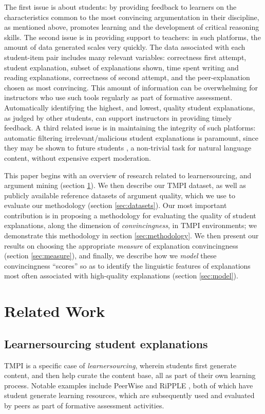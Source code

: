 \documentclass[notitlepage,12pt]{jedm}
\begin{document}
The first issue is about students: by providing feedback to learners on the 
characteristics common to the most convincing argumentation in their 
discipline, as mentioned above, promotes learning and the development of 
critical reasoning skills.
The second issue is in providing support to teachers: in such platforms, the 
amount of data generated scales very quickly.
The data associated with each student-item pair includes many relevant 
variables: correctness first attempt, student explanation, subset of 
explanations shown, time spent writing and reading explanations, correctness of 
second attempt, and the peer-explanation chosen as most convincing.   
This amount of information can be overwhelming for instructors who use such 
tools regularly as part of formative assessment. 
Automatically identifying the highest, and lowest, quality student 
explanations, as judged by other students, can support instructors in providing 
timely feedback. 
A third related issue is in maintaining the integrity of such platforms: 
automatic filtering irrelevant/malicious student explanations is paramount, 
since they may be shown to future students \cite{gagnon_filtering_2019}, a 
non-trivial task for natural language content, without expensive expert 
moderation.

This paper begins with an overview of research related to learnersourcing,  and 
argument mining (section \ref{sec:related_work}).
We then describe our TMPI dataset, as well as publicly available reference 
datasets of argument quality, which we use to evaluate our methodology (section 
\ref{sec:datasets}).
Our most important contribution is in proposing a methodology for evaluating 
the quality of student explanations, along the dimension of 
\textit{convincingness}, in TMPI environments; we demonstrate this methodology 
in section \ref{sec:methodology}.
We then present our results on choosing the appropriate \textit{measure} of 
explanation convincingness (section \ref{sec:measure}), and finally, we 
describe how we \textit{model} these convincingness ``scores'' so as to 
identify the linguistic features of explanations most often associated with 
high-quality explanations (section \ref{sec:model}).

\section{Related Work}\label{sec:related_work}

\subsection{Learnersourcing student explanations}
TMPI is a specific case of  
\textit{learnersourcing}\cite{weir_learnersourcing_2015}, wherein students first
generate content, and then help curate the content base, all as part of their 
own learning process.
Notable examples include PeerWise \cite{denny_peerwise:_2008} and RiPPLE 
\cite{khosravi_ripple_2019}, both of which have student generate learning 
resources, which are subsequently used and evaluated by peers as part of 
formative assessment activities.
\end{document}

